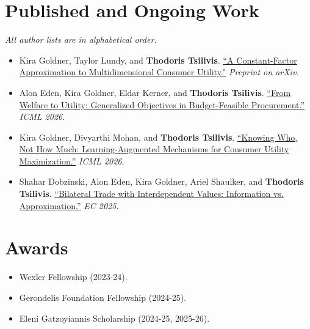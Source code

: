 \documentclass[10pt,letterpaper]{article}
\begin{document}
\section{Published and Ongoing Work}
\textit{All author lists are in alphabetical order.}
\begin{itemize}
  \item Kira Goldner, Taylor Lundy, and \textbf{Thodoris Tsilivis}. \href{https://arxiv.org/abs/2610.10516}{``A Constant-Factor Approximation to Multidimensional Consumer Utility.''} \textit{Preprint on arXiv}.
  \item Alon Eden, Kira Goldner, Eldar Kerner, and \textbf{Thodoris Tsilivis}. \href{https://arxiv.org/abs/2607.00101}{``From Welfare to Utility: Generalized Objectives in Budget-Feasible Procurement.''} \textit{ICML 2026}.
  \item Kira Goldner, Divyarthi Mohan, and \textbf{Thodoris Tsilivis}. \href{https://arxiv.org/abs/2607.00175}{``Knowing Who, Not How Much: Learning-Augmented Mechanisms for Consumer Utility Maximization.''} \textit{ICML 2026}.
  \item Shahar Dobzinski, Alon Eden, Kira Goldner, Ariel Shaulker, and \textbf{Thodoris Tsilivis}. \href{https://arxiv.org/abs/2506.23896}{``Bilateral Trade with Interdependent Values: Information vs. Approximation.''} \textit{EC 2025}.
\end{itemize}

\section{Awards}
\begin{itemize}
  \item Wexler Fellowship (2023-24).
  \item Gerondelis Foundation Fellowship (2024-25).
  \item Eleni Gatzoyiannis Scholarship (2024-25, 2025-26).
\end{itemize}
\end{document}
